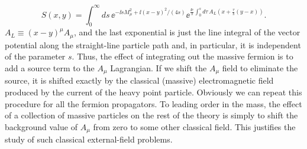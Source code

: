 \begin{equation}
  S(x,y)=\int_0^\infty ds\,
  \ee^{-\ii sM_\mu^2+\ii(x-y)^2/(4s)}
  \ee^{\frac{\ii e}{s}\int_0^s d\tau\,A_L\!\left(x+\frac{\tau}{s}(y-x)\right)}.
  \label{eq:6.16}
\end{equation}
$A_L\equiv(x-y)^\mu A_\mu$, and the last exponential is just the line integral of the vector
potential along the straight-line particle path and, in particular, it is independent of
the parameter $s$. Thus, the effect of integrating out the massive fermion is to add a
source term to the $A_\mu$ Lagrangian. If we shift the $A_\mu$ field to eliminate the source, it is
shifted exactly by the classical (massive) electromagnetic field produced by the current
of the heavy point particle. Obviously we can repeat this procedure for all the fermion
propagators. To leading order in the mass, the effect of a collection of massive particles
on the rest of the theory is simply to shift the background value of $A_\mu$ from zero to some
other classical field. This justifies the study of such classical external-field problems.
